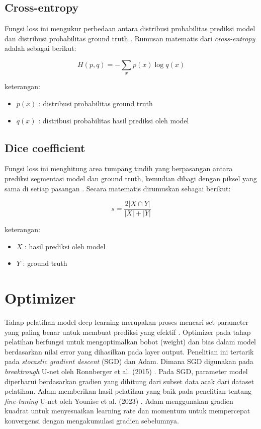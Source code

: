 \subsection{Cross-entropy} Fungsi loss ini mengukur perbedaan antara distribusi probabilitas prediksi model dan distribusi probabilitas ground truth \cite{herrera_impact_2022}. Rumusan matematis dari \textit{cross-entropy} adalah sebagai berikut:

\begin{equation} 
	H(p, q) = - \sum_{x} p(x) \log q(x) 
\end{equation} 

\noindent
keterangan:
\begin{itemize}
	\item $p(x)$ : distribusi probabilitas ground truth
	\item $q(x)$ : distribusi probabilitas hasil prediksi oleh model
\end{itemize}

\subsection{Dice coefficient} Fungsi loss ini menghitung area tumpang tindih yang berpasangan antara prediksi segmentasi model dan ground truth, kemudian dibagi dengan piksel yang sama di setiap pasangan \cite{herrera_impact_2022}. Secara matematis dirumuskan sebagai berikut:

\begin{equation}
	s = \frac{2|X \cap Y|}{|X| + |Y|}
\end{equation}
	
\noindent
keterangan:
\begin{itemize}
	\item $X$ : hasil prediksi oleh model
	\item $Y$ : ground truth
\end{itemize}


\section{Optimizer}
\noindent Tahap pelatihan model deep learning merupakan proses mencari set parameter yang paling benar untuk membuat prediksi yang efektif \cite{dawani_hands-mathematics_2020, bishop_deep_2024}. Optimizer pada tahap pelatihan berfungsi untuk mengoptimalkan bobot (weight) dan bias dalam model berdasarkan nilai error yang dihasilkan pada layer output.  Penelitian ini tertarik pada \textit{stocastic gradient descent} (SGD) dan Adam. Dimana SGD digunakan pada \textit{breaktrough} U-net oleh Ronnberger et al. (2015) \cite{ronneberger_u-net_2015}. Pada SGD, parameter model diperbarui berdasarkan gradien yang dihitung dari subset data acak dari dataset pelatihan. Adam memberikan hasil pelatihan yang baik pada penelitian tentang \textit{fine-tuning} U-net oleh Younise et al. (2023) \cite{younisse_fine-tuning_2023}. Adam menggunakan gradien kuadrat untuk menyesuaikan learning rate dan momentum untuk mempercepat konvergensi dengan mengakumulasi gradien sebelumnya.

